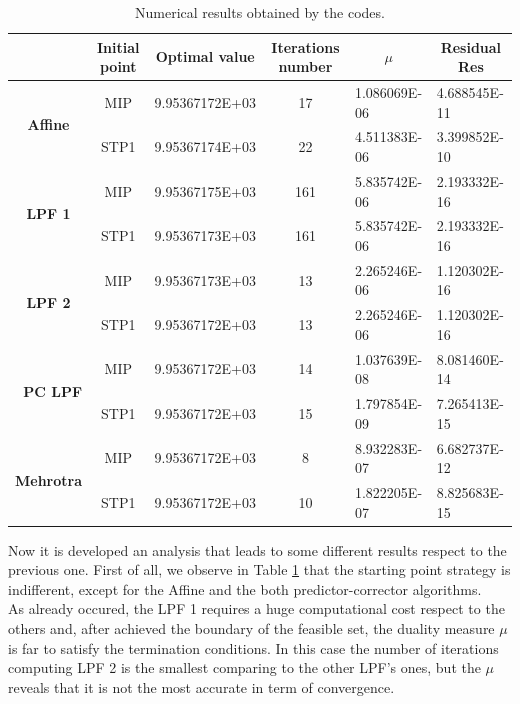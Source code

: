 \documentclass[a4paper,10 pt,titlepage,twoside]{book}
\theoremstyle{plain}
\theoremstyle{definition}
\theoremstyle{remark}
\begin{document}
\begin{table}[t]\caption{\label{table:SWE}Numerical results obtained by the codes.}
	\begin{tabular}{cclcll}
		\hline		\textbf{} & \textbf{Initial point} & \multicolumn{1}{c}{\textbf{Optimal value}} & \textbf{Iterations number} & \multicolumn{1}{c}{\textbf{$\mu$}} & \multicolumn{1}{c}{\textbf{Residual} Res} \\ \hline
		\multicolumn{1}{c|}{\multirow{2}{*}{\textbf{Affine}}} & MIP & 9.95367172E+03 & 17 & 1.086069E-06 & 4.688545E-11 \\
		\multicolumn{1}{c|}{} & STP1 & 9.95367174E+03 & 22 & 4.511383E-06 & 3.399852E-10 \\ \hline
		\multicolumn{1}{c|}{\multirow{2}{*}{\textbf{LPF 1}}} & MIP & 9.95367175E+03 & 161 & 5.835742E-06 & 2.193332E-16 \\
		\multicolumn{1}{c|}{} & STP1 & 9.95367173E+03 & 161 & 5.835742E-06 & 2.193332E-16 \\ \hline
		\multicolumn{1}{c|}{\multirow{2}{*}{\textbf{LPF 2}}} & MIP & 9.95367173E+03 & 13 & 2.265246E-06 & 1.120302E-16 \\
		\multicolumn{1}{c|}{} & STP1 & 9.95367172E+03 & 13 & 2.265246E-06 & 1.120302E-16 \\ \hline
		\multicolumn{1}{r|}{\multirow{2}{*}{\textbf{PC LPF}}} & MIP & 9.95367172E+03 & 14 & 1.037639E-08 & 8.081460E-14 \\
		\multicolumn{1}{r|}{} & STP1 & 9.95367172E+03 & 15 & 1.797854E-09 & 7.265413E-15 \\ \hline
		\multicolumn{1}{c|}{\multirow{2}{*}{\textbf{Mehrotra}}} & MIP & 9.95367172E+03 & 8 & 8.932283E-07 & 6.682737E-12 \\
		\multicolumn{1}{c|}{} & STP1 & 9.95367172E+03 & 10 & 1.822205E-07 & 8.825683E-15 \\ \hline
	\end{tabular}
\end{table}
Now it is developed an analysis that leads to 
some different results respect to the previous one. First of all, we observe in Table \ref{table:SWE} that the starting point strategy is indifferent, except for the Affine and the both predictor-corrector algorithms.\\As already occured, the LPF 1 requires a huge computational cost respect to the others and, after achieved the boundary of the feasible set, the duality measure $\mu$ is far to satisfy the termination conditions. In this case the number of iterations computing LPF 2 is the smallest comparing to the other LPF's ones, but the $\mu$ reveals that it is not the most accurate in term of convergence.\\
\end{document}
